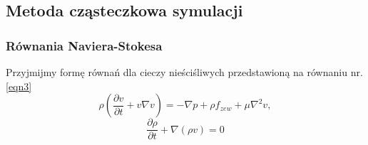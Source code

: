 \documentclass{article}
\begin{document}
\subsection{Metoda cząsteczkowa symulacji}
\subsubsection{Równania Naviera-Stokesa}
Przyjmijmy formę równań\cite{sca03} dla cieczy nieściśliwych przedstawioną na równaniu nr. \ref{eqn3}\newline
\begin{equation}\label{eqn3}
\rho \left (
    \frac{\partial v}{\partial t} + v \nabla v
\right )
= - \nabla p + \rho f_{zew} + \mu \nabla^2v,
\end{equation}
$$
\frac{\partial \rho}{\partial t} + \nabla(\rho v) = 0
$$
\end{document}

